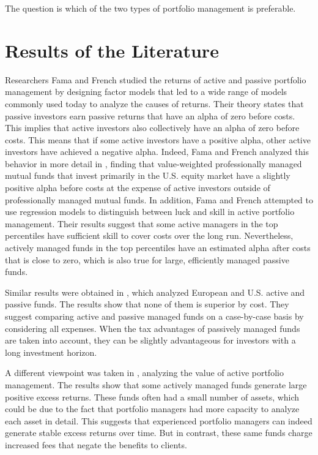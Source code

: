 \documentclass[
  oneside, a4paper, 12pt, openany]{book}
\theoremstyle{definition}
\theoremstyle{definition}
\theoremstyle{definition}
\theoremstyle{definition}
\theoremstyle{remark}
\begin{document}
The question is which of the two types of portfolio management is preferable.

\hypertarget{results-of-the-literature}{%
\section{Results of the Literature}\label{results-of-the-literature}}

Researchers Fama and French studied the returns of active and passive portfolio management by designing factor models that led to a wide range of models commonly used today to analyze the causes of returns. Their theory states that passive investors earn passive returns that have an alpha of zero before costs. This implies that active investors also collectively have an alpha of zero before costs. This means that if some active investors have a positive alpha, other active investors have achieved a negative alpha. Indeed, Fama and French analyzed this behavior in more detail in \citep{FaFr2010}, finding that value-weighted professionally managed mutual funds that invest primarily in the U.S. equity market have a slightly positive alpha before costs at the expense of active investors outside of professionally managed mutual funds. In addition, Fama and French attempted to use regression models to distinguish between luck and skill in active portfolio management. Their results suggest that some active managers in the top percentiles have sufficient skill to cover costs over the long run. Nevertheless, actively managed funds in the top percentiles have an estimated alpha after costs that is close to zero, which is also true for large, efficiently managed passive funds.

Similar results were obtained in \citep{PaHi2016}, which analyzed European and U.S. active and passive funds. The results show that none of them is superior by cost. They suggest comparing active and passive managed funds on a case-by-case basis by considering all expenses. When the tax advantages of passively managed funds are taken into account, they can be slightly advantageous for investors with a long investment horizon.

A different viewpoint was taken in \citep{RaSh2004}, analyzing the value of active portfolio management. The results show that some actively managed funds generate large positive excess returns. These funds often had a small number of assets, which could be due to the fact that portfolio managers had more capacity to analyze each asset in detail. This suggests that experienced portfolio managers can indeed generate stable excess returns over time. But in contrast, these same funds charge increased fees that negate the benefits to clients.
\end{document}
